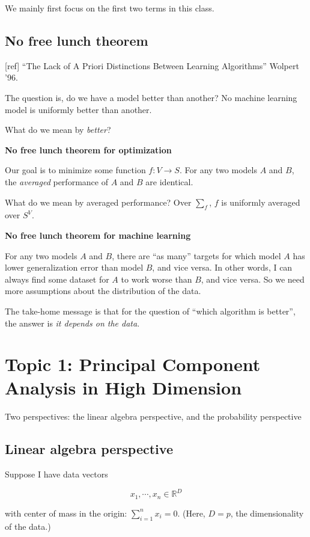 \documentclass[12pt]{article}
\theoremstyle{plain}
\begin{document}
We mainly first focus on the first two terms in this class.

\subsection*{No free lunch theorem}

[ref] ``The Lack of A Priori Distinctions Between Learning Algorithms'' Wolpert '96.

The question is, do we have a model better than another? No machine learning model is uniformly better than another.

What do we mean by \textit{better}?

{\bf No free lunch theorem for optimization}

Our goal is to minimize some function $f : V \rightarrow S $. For any two models $A$ and $B$, the \textit{averaged} performance of $A$ and $B$ are identical.

What do we mean by averaged performance? Over $\sum_f$, $f$ is uniformly averaged over $S^V$.

{\bf No free lunch theorem for machine learning}

For any two models $A$ and $B$, there are ``as many'' targets for which model $A$ has lower generalization error than model $B$, and vice versa. In other words, I can always find some dataset for $A$ to work worse than $B$, and vice versa. So we need more assumptions about the distribution of the data.

The take-home message is that for the question of ``which algorithm is better'', the answer is \textit{it depends on the data}.


\section*{Topic 1: Principal Component Analysis in High Dimension}

Two perspectives: the linear algebra perspective, and the probability perspective

\subsection*{Linear algebra perspective}

Suppose I have data vectors

$$ x_1, \cdots, x_n \in \mathbb{R}^D $$

with center of mass in the origin: $\sum_{i=1}^n x_i = 0$. (Here, $D = p$, the dimensionality of the data.)
\end{document}
